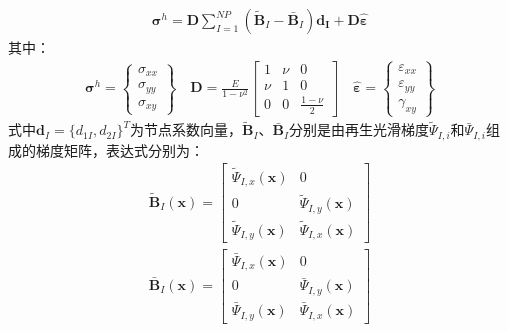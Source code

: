 \begin{equation}
\begin{split}
\pmb{\sigma}^h=\pmb{D}\sum_{I=1}^{N\!P}(\tilde{\pmb{B}}_I-\bar{\pmb{B}}_I)\pmb{d_I}+\pmb{D}\hat{\pmb{\varepsilon}}
\end{split}
\end{equation}
其中：
\begin{equation}
\begin{split}
    \pmb{\sigma}^h=\left\{\begin{matrix}
        \sigma_{xx}\\\sigma_{yy}\\\sigma_{xy}
        \end{matrix}\right\}\quad
    \pmb{D}=\frac{E}{1-\nu^2}
    \left[\begin{matrix}
    1&\nu&0\\\nu&1&0\\0&0&\frac{1-\nu}{2}
    \end{matrix}\right]\quad
    \hat{\pmb{\varepsilon}}=\left\{\begin{matrix}
        \varepsilon_{xx}\\\varepsilon_{yy}\\\gamma_{xy}
     \end{matrix}\right\}
\end{split}
\end{equation}
式中$\pmb{d}_I=\{d_{1I},d_{2I}\}^T$为节点系数向量，$\tilde{\pmb{B}}_I\text{、}\bar{\pmb{B}}_I$分别是由再生光滑梯度$\tilde{\Psi}_{I,i}$和$\bar{\Psi}_{I,i}$组成的梯度矩阵，表达式分别为：
\begin{equation}
\begin{split}
    \tilde{\pmb{B}}_I(\pmb{x})= \left[\begin{matrix}\tilde{\Psi}_{I,x}(\pmb{x})&0\\0&\tilde{\Psi}_{I,y}(\pmb{x})\\\tilde{\Psi}_{I,y}(\pmb{x})&\tilde{\Psi}_{I,x}(\pmb{x}) \end{matrix}\right] 
\end{split}
\end{equation}
\begin{equation}
\begin{split}
    \bar{\pmb{B}}_I(\pmb{x})= \left[\begin{matrix}\bar{\Psi}_{I,x}(\pmb{x})&0\\0&\bar{\Psi}_{I,y}(\pmb{x})\\\bar{\Psi}_{I,y}(\pmb{x})&\bar{\Psi}_{I,x}(\pmb{x}) \end{matrix}\right] 
\end{split}
\end{equation}
